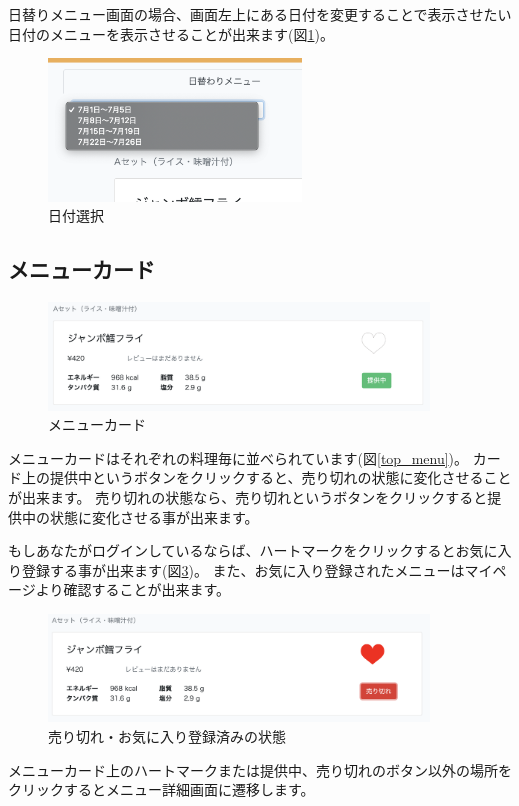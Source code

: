 \documentclass[a4paper]{ltjsarticle}
\begin{document}
    日替りメニュー画面の場合、画面左上にある日付を変更することで表示させたい日付のメニューを表示させることが出来ます(図\ref{date_select})。
    \begin{figure}[htbp]
        \centering
        \caption{日付選択}
        \label{date_select}
        \includegraphics[width=0.6\textwidth]{image/date_select.png}
    \end{figure}
    \newpage

\subsection{メニューカード}
    \begin{figure}[htbp]
    \centering
        \caption{メニューカード}
        \label{menu_card}
        \includegraphics[width=0.9\textwidth]{image/menu_card.png}
    \end{figure}

    メニューカードはそれぞれの料理毎に並べられています(図\ref{top_menu})。
    カード上の提供中というボタンをクリックすると、売り切れの状態に変化させることが出来ます。
    売り切れの状態なら、売り切れというボタンをクリックすると提供中の状態に変化させる事が出来ます。

    もしあなたがログインしているならば、ハートマークをクリックするとお気に入り登録する事が出来ます(図\ref{manu_card_love})。
    また、お気に入り登録されたメニューはマイページより確認することが出来ます。

    \begin{figure}[htbp]
    \centering
        \caption{売り切れ・お気に入り登録済みの状態}
        \label{manu_card_love}
        \includegraphics[width=0.9\textwidth]{image/menu_card_love.png}
    \end{figure}
    メニューカード上のハートマークまたは提供中、売り切れのボタン以外の場所をクリックするとメニュー詳細画面に遷移します。
    \newpage
\end{document}
